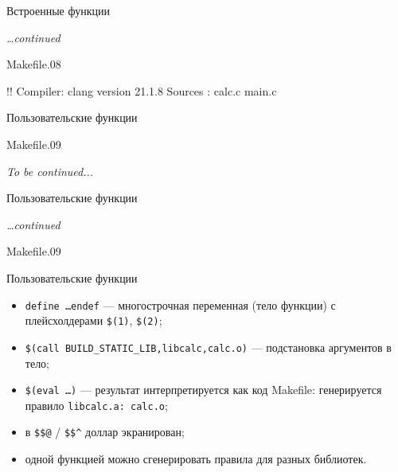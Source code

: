 \documentclass[compress, 8pt, aspectratio=169]{beamer}
\begin{document}
\begin{frame}[fragile]{Встроенные функции}

  \textit{\dots continued}

  \bigbreak

    {Makefile.08}

  \bigbreak

  \begin{terminalwindow}
!!
Compiler: clang version 21.1.8
Sources : calc.c main.c
  \end{terminalwindow}

\end{frame}

\begin{frame}[fragile]{Пользовательские функции}

    {Makefile.09}

  \textit{To be continued...}

\end{frame}

\begin{frame}[fragile]{Пользовательские функции}

  \textit{\dots continued}

  \bigbreak

    {Makefile.09}

\end{frame}

\begin{frame}{Пользовательские функции}

  \begin{itemize}

    \item \texttt{define \dots \space endef} --- многострочная переменная
      (тело функции) с плейсхолдерами \texttt{\$(1)},
      \texttt{\$(2)};

    \item \texttt{\$(call BUILD\_STATIC\_LIB,libcalc,calc.o)}
      --- подстановка аргументов в тело;

    \item \texttt{\$(eval \dots)} --- результат интерпретируется как код
      Makefile: генерируется правило \texttt{libcalc.a: calc.o};

    \item в \texttt{\$\$@} / \texttt{\$\$\^{}} доллар экранирован;

    \item одной функцией можно сгенерировать правила для
      разных библиотек.

  \end{itemize}

\end{frame}
\end{document}
